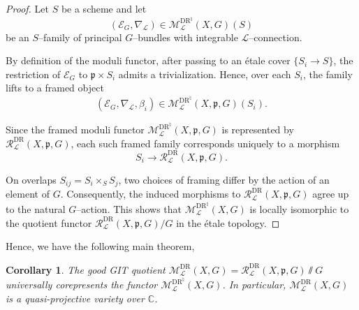 \documentclass[12pt,reqno]{amsart}
\numberwithin{equation}{subsection}
\newtheorem{thm}[equation]{Theorem}
\newtheorem{corollary}[equation]{Corollary}
\theoremstyle{definition}
\theoremstyle{theorem}
\begin{document}
\begin{proof}
	Let $S$ be a scheme and let
	\[
	(\mathcal{E}_{G},\nabla_{\mathcal{L}})
	\in
	\mathcal{M}^{\text{DR}^{\natural}}_{\mathcal{L}}(X,G)(S)
	\]
	be an $S$--family of principal $G$--bundles with integrable
	$\mathcal{L}$--connection.
	
	By definition of the moduli functor, after passing to an étale cover
	$\{S_i \to S\}$, the restriction of $\mathcal{E}_{G}$ to
	$\mathfrak{p}\times S_i$ admits a trivialization. Hence, over each $S_i$,
	the family lifts to a framed object
	\[
	(\mathcal{E}_{G},\nabla_{\mathcal{L}},\beta_i)
	\in
	\mathcal{M}^{\text{DR}^{\natural}}_{\mathcal{L}}(X,\mathfrak{p},G)(S_i).
	\]
	
	Since the framed moduli functor
	$\mathcal{M}^{\text{DR}^{\natural}}_{\mathcal{L}}(X,\mathfrak{p},G)$ is represented by $\mathcal{R}^{\text{DR}}_{\mathcal{L}}(X,\mathfrak{p},G)$, each such framed family corresponds uniquely to a morphism
	\[
	S_i \longrightarrow \mathcal{R}^{\text{DR}}_{\mathcal{L}}(X,\mathfrak{p},G).
	\]
	
	On overlaps $S_{ij}=S_i\times_S S_j$, two choices of framing differ by the
	action of an element of $G$. Consequently, the induced morphisms to
	$\mathcal{R}^{\text{DR}}_{\mathcal{L}}(X,\mathfrak{p},G)$ agree up to the natural $G$--action. This shows that $\mathcal{M}^{\text{DR}^{\natural}}_{\mathcal{L}}(X,G)$
	is locally isomorphic to the quotient functor
	$\mathcal{R}^{\text{DR}}_{\mathcal{L}}(X,\mathfrak{p},G)/G$ in the étale topology.
\end{proof}

Hence, we have the following main theorem,
\begin{corollary}\label{cor:moduli of int-L-connection PB}
	The good GIT quotient $
	\mathcal{M}^{\text{DR}}_{\mathcal{L}}(X,G)
	=
	\mathcal{R}^{\text{DR}}_{\mathcal{L}}(X,\mathfrak{p},G)\sslash G
	$
	universally corepresents the functor
	$\mathcal{M}^{\text{DR}^{\natural}}_{\mathcal{L}}(X,G)$. In particular, $\mathcal{M}^{\text{DR}}_{\mathcal{L}}(X,G)$ is a quasi-projective variety over $\mathbb{C}$.
\end{corollary}




\end{document}
